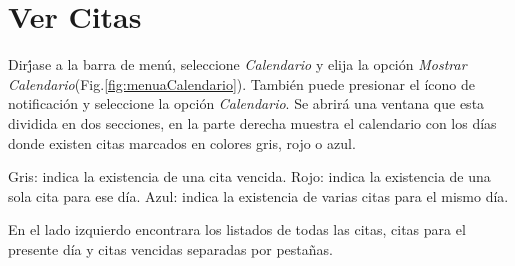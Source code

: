 \section{Ver Citas}
\label{sec:verCita}

Dir\'jase a la barra de men\'u, seleccione \emph{Calendario} y elija la opci\'on \emph{Mostrar Calendario}(Fig.\ref{fig:menuaCalendario}). Tambi\'en puede presionar el \'icono de notificaci\'on y seleccione la opci\'on \emph{Calendario}. Se abrir\'a una ventana que esta dividida en dos secciones, en la parte derecha muestra el calendario con los d\'ias donde existen citas marcados en colores gris, rojo o azul. 

Gris: indica la existencia de una cita vencida.
Rojo: indica la existencia de una sola cita para ese d\'ia.
Azul: indica la existencia de varias citas para el mismo d\'ia.


En el lado izquierdo encontrara los listados de todas las citas, citas para el presente d\'ia y citas vencidas separadas por pesta\~nas.
  

